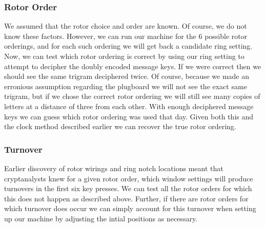 \subsubsection{Rotor Order}
We assumed that the rotor choice and order are known. Of course, we do not know these factors. However, we can run our machine for the $6$ possible rotor orderings, and for each such ordering we will get back a candidate ring setting. Now, we can test which rotor ordering is correct by using our ring setting to attempt to decipher the doubly encoded message keys. If we were correct then we should see the same trigram deciphered twice. Of course, because we made an erronious assumption regarding the plugboard we will not see the exact same trigram, but if we chose the correct rotor ordering we will still see many copies of letters at a distance of three from each other. With enough deciphered message keys we can guess which rotor ordering was used that day. Given both this and the clock method described earlier we can recover the true rotor ordering.

\subsubsection{Turnover}
Earlier discovery of rotor wirings and ring notch locations meant that cryptanalysts knew for a given rotor order, which window settings will produce turnovers in the first six key presses. We can test all the rotor orders for which this does not happen as described above. Further, if there are rotor orders for which turnover does occur we can simply account for this turnover when setting up our machine by adjusting the intial positions as necessary.

